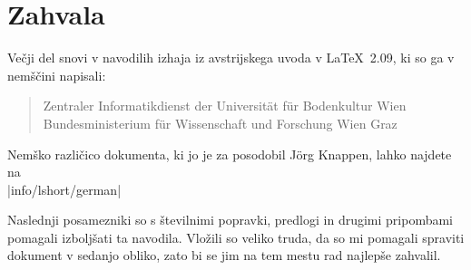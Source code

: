 \chapter{Zahvala}
\noindent Večji del snovi v navodilih izhaja iz 
avstrijskega uvoda v \LaTeX\ 2.09, ki so ga v nemščini napisali:
\begin{verse}
%
{Zentraler Informatikdienst der Universit\"at f\"ur Bodenkultur Wien}
%
   {Bundesministerium f\"ur Wissenschaft und Forschung Wien}
%
   {Graz}
\end{verse}

Nemško različico dokumenta, ki jo je za 
\LaTeXe{} posodobil J\"org Knappen, lahko najdete na\\
\CTAN|info/lshort/german|

\newpage \noindent 
Naslednji posamezniki so s številnimi popravki, 
predlogi in drugimi pripombami pomagali izboljšati ta navodila. 
Vložili so veliko truda, da so mi pomagali spraviti dokument v
sedanjo obliko, zato bi se jim na tem mestu rad najlepše zahvalil.

